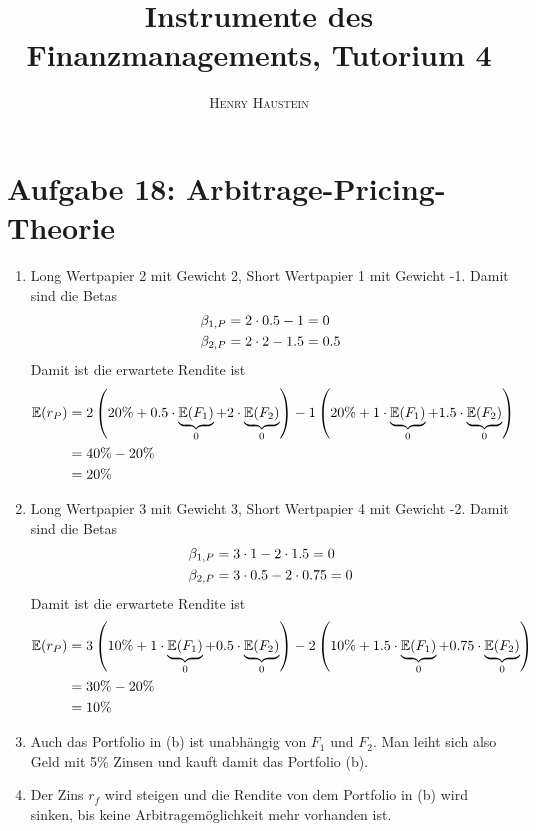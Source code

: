 \documentclass{article}
\title{\textbf{Instrumente des Finanzmanagements, Tutorium 4}}
\author{\textsc{Henry Haustein}}
\date{}
\newcommand{\E}{\mathbb{E}}
\begin{document}
	\maketitle
	
	\section*{Aufgabe 18: Arbitrage-Pricing-Theorie}
	\begin{enumerate}[label=(\alph*)]
		\item Long Wertpapier 2 mit Gewicht 2, Short Wertpapier 1 mit Gewicht -1. Damit sind die Betas
		\begin{align}
			\beta_{1,P} &= 2\cdot 0.5 - 1 = 0 \notag \\
			\beta_{2,P} &= 2\cdot 2 - 1.5 = 0.5 \notag
		\end{align}
		Damit ist die erwartete Rendite ist
		\begin{align}
			\E(r_P) &= 2\left(20\% + 0.5\cdot\underbrace{\E(F_1)}_{0} + 2\cdot\underbrace{\E(F_2)}_{0}\right) - 1\left(20\% + 1\cdot\underbrace{\E(F_1)}_{0} + 1.5\cdot\underbrace{\E(F_2)}_{0}\right) \notag \\
			&= 40\% - 20\% \notag \\
			&= 20\%\notag
		\end{align}
		\item Long Wertpapier 3 mit Gewicht 3, Short Wertpapier 4 mit Gewicht -2. Damit sind die Betas
		\begin{align}
			\beta_{1,P} &= 3\cdot 1 - 2\cdot 1.5 = 0 \notag \\
			\beta_{2,P} &= 3\cdot 0.5 - 2\cdot 0.75 = 0 \notag
		\end{align}
		Damit ist die erwartete Rendite ist
		\begin{align}
			\E(r_P) &= 3\left(10\% + 1\cdot\underbrace{\E(F_1)}_{0} + 0.5\cdot\underbrace{\E(F_2)}_{0}\right) - 2\left(10\% + 1.5\cdot\underbrace{\E(F_1)}_{0} + 0.75\cdot\underbrace{\E(F_2)}_{0}\right) \notag \\
			&= 30\% - 20\% \notag \\
			&= 10\%\notag
		\end{align}
		\item Auch das Portfolio in (b) ist unabhängig von $F_1$ und $F_2$. Man leiht sich also Geld mit 5\% Zinsen und kauft damit das Portfolio (b).
		\item Der Zins $r_f$ wird steigen und die Rendite von dem Portfolio in (b) wird sinken, bis keine Arbitragemöglichkeit mehr vorhanden ist.
	\end{enumerate}
\end{document}
